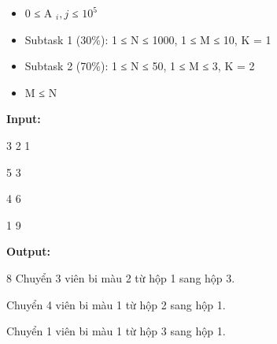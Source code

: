 \begin{itemize}
	\item     0 ≤ A    $_     i, j    $    ≤ $10^{5}$
	\item     Subtask 1 (30\%): 1 ≤ N ≤ 1000, 1 ≤ M ≤ 10, K = 1   
	\item     Subtask 2 (70\%): 1 ≤ N ≤ 50, 1 ≤ M ≤ 3, K = 2   
	\item     M ≤ N   
\end{itemize}
\textbf{    Input:   }

   3 2 1  

   5 3  

   4 6  

   1 9  

\textbf{    Output:   }

   8
Chuyển 3 viên bi màu 2 từ hộp 1 sang hộp 3.  

   Chuyển 4 viên bi màu 1 từ hộp 2 sang hộp 1.  

   Chuyển 1 viên bi màu 1 từ hộp 3 sang hộp 1.